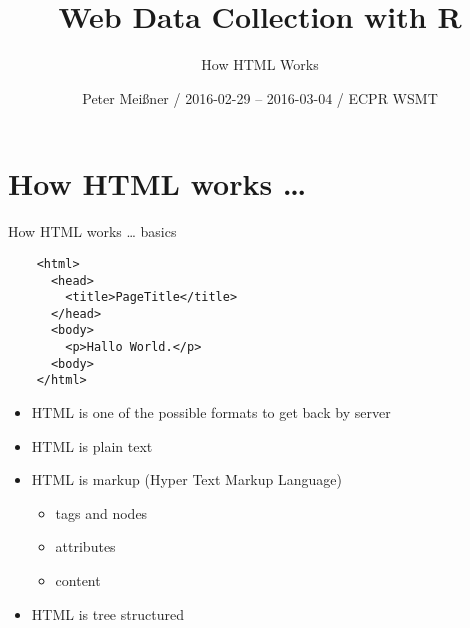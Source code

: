 \documentclass[ignorenonframetext,]{beamer}
\title{Web Data Collection with R}
\subtitle{How HTML Works}
\author{Peter Meißner / 2016-02-29 -- 2016-03-04 / ECPR WSMT}
\date{}
\providecommand{\tightlist}{%
  \setlength{\itemsep}{0pt}\setlength{\parskip}{0pt}}
\begin{document}
\frame{\titlepage}

\begin{frame}
\tableofcontents[hideallsubsections]
\end{frame}

\section{How HTML works \ldots{}}\label{how-html-works}

\begin{frame}[fragile]{How HTML works \ldots{} basics}

\begin{verbatim}
    <html>
      <head>
        <title>PageTitle</title>
      </head>
      <body>
        <p>Hallo World.</p>
      <body>
    </html>
\end{verbatim}

\begin{itemize}
\tightlist
\item
  HTML is one of the possible formats to get back by server
\item
  HTML is plain text
\item
  HTML is markup (Hyper Text Markup Language)

  \begin{itemize}
  \tightlist
  \item
    tags and nodes
  \item
    attributes
  \item
    content
  \end{itemize}
\item
  HTML is tree structured
\end{itemize}

\end{frame}
\end{document}
